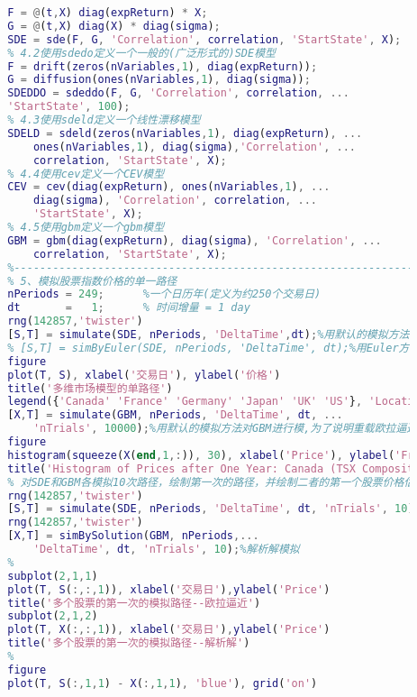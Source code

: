 \begin{lstlisting}[language= Matlab]
        % 4.1使用sde定义一个一般的(广泛形式的)SDE模型
        F = @(t,X) diag(expReturn) * X;
        G = @(t,X) diag(X) * diag(sigma);
        SDE = sde(F, G, 'Correlation', correlation, 'StartState', X);
        % 4.2使用sdedo定义一个一般的(广泛形式的)SDE模型
        F = drift(zeros(nVariables,1), diag(expReturn));
        G = diffusion(ones(nVariables,1), diag(sigma));
        SDEDDO = sdeddo(F, G, 'Correlation', correlation, ...
        'StartState', 100);
        % 4.3使用sdeld定义一个线性漂移模型
        SDELD = sdeld(zeros(nVariables,1), diag(expReturn), ...
            ones(nVariables,1), diag(sigma),'Correlation', ...
            correlation, 'StartState', X);
        % 4.4使用cev定义一个CEV模型
        CEV = cev(diag(expReturn), ones(nVariables,1), ...
            diag(sigma), 'Correlation', correlation, ...
            'StartState', X);
        % 4.5使用gbm定义一个gbm模型
        GBM = gbm(diag(expReturn), diag(sigma), 'Correlation', ...
            correlation, 'StartState', X);
        %---------------------------------------------------------------%
        % 5、模拟股票指数价格的单一路径
        nPeriods = 249;      %一个日历年(定义为约250个交易日)
        dt       =   1;      % 时间增量 = 1 day
        rng(142857,'twister')
        [S,T] = simulate(SDE, nPeriods, 'DeltaTime',dt);%用默认的模拟方法对SDE进行模拟
        % [S,T] = simByEuler(SDE, nPeriods, 'DeltaTime', dt);%用Euler方法进行模拟
        figure
        plot(T, S), xlabel('交易日'), ylabel('价格')
        title('多维市场模型的单路径')
        legend({'Canada' 'France' 'Germany' 'Japan' 'UK' 'US'}, 'Location', 'Best')
        [X,T] = simulate(GBM, nPeriods, 'DeltaTime', dt, ...
            'nTrials', 10000);%用默认的模拟方法对GBM进行模,为了说明重载欧拉逼近法的性能优势，增加试验次数为10000
        figure
        histogram(squeeze(X(end,1,:)), 30), xlabel('Price'), ylabel('Frequency')
        title('Histogram of Prices after One Year: Canada (TSX Composite)')
        % 对SDE和GBM各模拟10次路径，绘制第一次的路径，并绘制二者的第一个股票价格估计差
        rng(142857,'twister')
        [S,T] = simulate(SDE, nPeriods, 'DeltaTime', dt, 'nTrials', 10);
        rng(142857,'twister')
        [X,T] = simBySolution(GBM, nPeriods,...
            'DeltaTime', dt, 'nTrials', 10);%解析解模拟
        %
        subplot(2,1,1)
        plot(T, S(:,:,1)), xlabel('交易日'),ylabel('Price')
        title('多个股票的第一次的模拟路径--欧拉逼近')
        subplot(2,1,2)
        plot(T, X(:,:,1)), xlabel('交易日'),ylabel('Price')
        title('多个股票的第一次的模拟路径--解析解')
        %
        figure
        plot(T, S(:,1,1) - X(:,1,1), 'blue'), grid('on')

\end{lstlisting}
